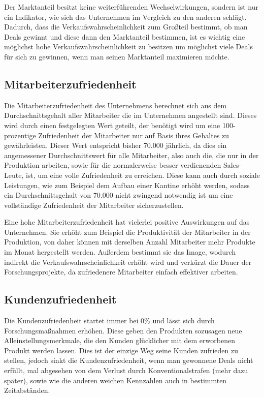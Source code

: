 Der Marktanteil besitzt keine weiterführenden Wechselwirkungen, sondern ist nur ein Indikator, wie sich das Unternehmen im Vergleich zu den anderen schlägt. Dadurch, dass die Verkaufswahrscheinlichkeit zum Großteil bestimmt, ob man Deals gewinnt und diese dann den Marktanteil bestimmen, ist es wichtig eine möglichst hohe Verkaufswahrscheinlichkeit zu besitzen um möglichst viele Deals für sich zu gewinnen, wenn man seinen Marktanteil maximieren möchte. 

\subsection{Mitarbeiterzufriedenheit}
Die Mitarbeiterzufriedenheit des Unternehmens berechnet sich aus dem Durchschnittsgehalt aller Mitarbeiter die im Unternehmen angestellt sind. Dieses wird durch einen festgelegten Wert geteilt, der benötigt wird um eine 100-prozentige Zufriedenheit der Mitarbeiter nur auf Basis ihres Gehaltes zu gewährleisten. Dieser Wert entspricht bisher 70.000\€ jährlich, da dies ein angemessener Durchschnittswert für alle Mitarbeiter, also auch die, die nur in der Produktion arbeiten, sowie für die normalerweise besser verdienenden Sales-Leute, ist, um eine volle Zufriedenheit zu erreichen. Diese kann auch durch soziale Leistungen, wie zum Beispiel dem Aufbau einer Kantine erhöht werden, sodass ein Durchschnittsgehalt von 70.000\€ nicht zwingend notwendig ist um eine vollständige Zufriedenheit der Mitarbeiter sicherzustellen. 

Eine hohe Mitarbeiterzufriedenheit hat vielerlei positive Auswirkungen auf das Unternehmen. Sie erhöht zum Beispiel die Produktivität der Mitarbeiter in der Produktion, von daher können mit derselben Anzahl Mitarbeiter mehr Produkte im Monat hergestellt werden. Außerdem bestimmt sie das Image, wodurch indirekt die Verkaufswahrscheinlichkeit erhöht wird und verkürzt die Dauer der Forschungsprojekte, da zufriedenere Mitarbeiter einfach effektiver arbeiten. 
\subsection{Kundenzufriedenheit}
Die Kundenzufriedenheit startet immer bei 0\% und lässt sich durch Forschungsmaßnahmen erhöhen. Diese geben den Produkten sozusagen neue Alleinstellungsmerkmale, die den Kunden glücklicher mit dem erworbenen Produkt werden lassen. Dies ist der einzige Weg seine Kunden zufrieden zu stellen, jedoch sinkt die Kundenzufriedenheit, wenn man gewonnene Deals nicht erfüllt, mal abgesehen von dem Verlust durch Konventionalstrafen (mehr dazu später), sowie wie die anderen weichen Kennzahlen auch in bestimmten Zeitabständen.

